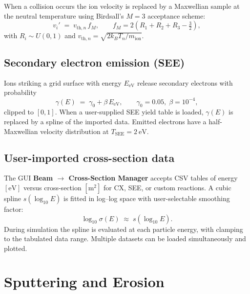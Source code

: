 \documentclass[11pt,a4paper]{article}
\begin{document}
When a collision occurs the ion velocity is replaced by a
Maxwellian sample at the neutral temperature using Birdsall's
\(M\!=\!3\) acceptance scheme:
\begin{equation}
    v_{i}' \;=\; v_{\mathrm{th},n}\,f_{M}, \qquad
    f_{M} = 2\left(R_{1}+R_{2}+R_{3}-\tfrac{3}{2}\right),
\end{equation}
with \(R_{i}\sim U(0,1)\) and
\(v_{\mathrm{th},n}=\sqrt{2k_{B}T_{n}/m_{\mathrm{ion}}}\).

\subsection{Secondary electron emission (SEE)}

Ions striking a grid surface with energy \(E_{\mathrm{eV}}\)
release secondary electrons with probability
\begin{equation}
    \gamma(E) \;=\; \gamma_{0}+\beta\,E_{\mathrm{eV}},
    \qquad \gamma_{0}=0.05,\;\beta=10^{-4},
\end{equation}
clipped to \([0,1]\).  When a user-supplied SEE yield table is
loaded, \(\gamma(E)\) is replaced by a spline of the imported
data.  Emitted electrons have a half-Maxwellian velocity
distribution at \(T_{\mathrm{SEE}}=\SI{2}{\electronvolt}\).

\subsection{User-imported cross-section data}
\label{sec:csimport}

The GUI \textbf{Beam $\rightarrow$ Cross-Section Manager} accepts
CSV tables of energy \([\si{\electronvolt}]\) versus cross-section
\([\si{\meter\squared}]\) for CX, SEE, or custom reactions.
A cubic spline \(s(\log_{10}E)\) is fitted in log--log space with
user-selectable smoothing factor:
\begin{equation}
    \log_{10}\sigma(E) \;\approx\; s\!\left(\log_{10}E\right).
\end{equation}
During simulation the spline is evaluated at each particle
energy, with clamping to the tabulated data range.  Multiple
datasets can be loaded simultaneously and plotted.

\section{Sputtering and Erosion}
\end{document}
